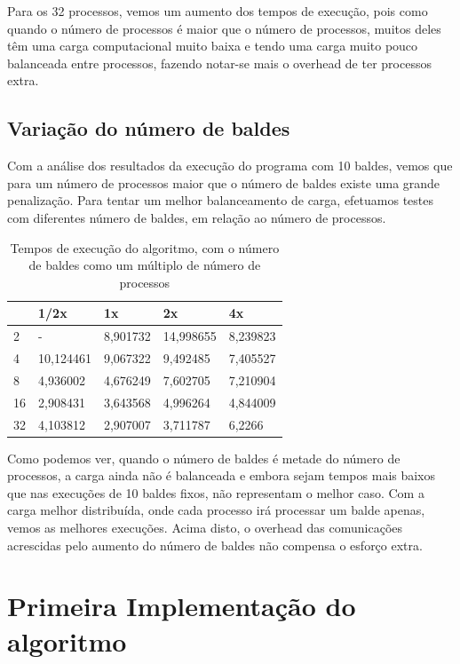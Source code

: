 \documentclass[a4paper]{report}
\begin{document}
Para os 32 processos, vemos um aumento dos tempos de execução, pois como quando
o número de processos é maior que o número de processos, muitos deles têm uma
carga computacional muito baixa e tendo uma carga muito pouco balanceada entre
processos, fazendo notar-se mais o overhead de ter processos extra.

\section{Variação do número de baldes}

Com a análise dos resultados da execução do programa com 10 baldes, vemos que
para um número de processos maior que o número de baldes existe uma grande
penalização. Para tentar um melhor balanceamento de carga, efetuamos testes com
diferentes número de baldes, em relação ao número de processos.

\begin{table}[h]
    \centering
    \begin{tabular}{|l|l|l|l|l|}
        \hline
   & 1/2x      & 1x       & 2x        & 4x       \\ \hline
        2  & -         & 8,901732 & 14,998655 & 8,239823 \\ \hline
        4  & 10,124461 & 9,067322 & 9,492485  & 7,405527 \\ \hline
        8  & 4,936002  & 4,676249 & 7,602705  & 7,210904 \\ \hline
        16 & 2,908431  & 3,643568 & 4,996264  & 4,844009 \\ \hline
        32 & 4,103812  & 2,907007 & 3,711787  & 6,2266   \\ \hline
    \end{tabular}
    \caption{\label{tab:varb}Tempos de execução do algoritmo, com o número de
    baldes como um múltiplo de número de processos}
\end{table}

Como podemos ver, quando o número de baldes é metade do número de processos, a
carga ainda não é balanceada e embora sejam tempos mais baixos que nas execuções
de 10 baldes fixos, não representam o melhor caso. Com a carga melhor
distribuída, onde cada processo irá processar um balde apenas, vemos as melhores
execuções. Acima disto, o overhead das comunicações acrescidas pelo aumento do
número de baldes não compensa o esforço extra.

\appendix

\chapter{Primeira Implementação do algoritmo} \label{apx:slowpar}
\end{document}
